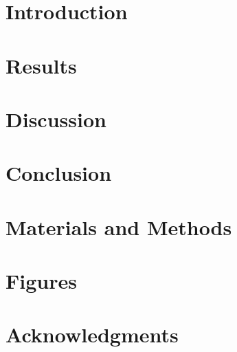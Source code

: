 \documentclass{article}
\begin{document}
\maketitle

\begin{abstract}
  \lipsum[1]{}
\end{abstract}

\listoftodos

\section{Introduction}
\lipsum[2-5]{}

\section{Results}
\lipsum[6-10]{}

\section{Discussion}
\lipsum[11-15]{}

\section{Conclusion}
\lipsum[16-20]{}

\section{Materials and Methods}
\lipsum[21-25]{}

\newpage
\section*{Figures}


\pagebreak

\section*{Acknowledgments}
\glsresetall{}



\end{document}
